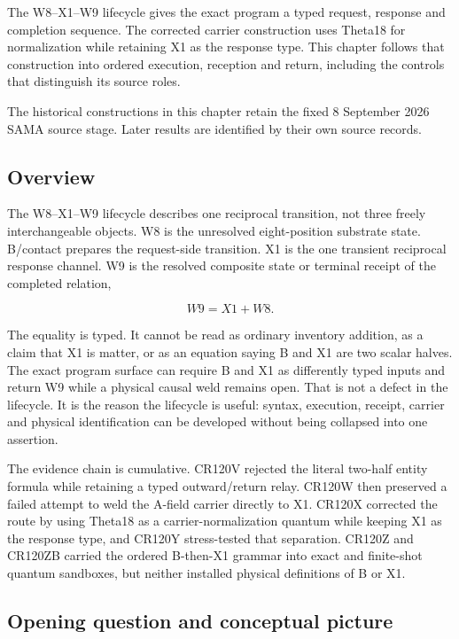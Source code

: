 \label{viii-ch05-lifecycle-reception-and-carrier-return}

The W8--X1--W9 lifecycle gives the exact program a typed request, response and completion sequence. The corrected carrier construction uses Theta18 for normalization while retaining X1 as the response type. This chapter follows that construction into ordered execution, reception and return, including the controls that distinguish its source roles.

The historical constructions in this chapter retain the fixed 8 September 2026 SAMA source stage. Later results are identified by their own source records.

\subsection{Overview}\label{viii-ch05-overview}

The W8--X1--W9 lifecycle describes one reciprocal transition, not three
freely interchangeable objects. W8 is the unresolved eight-position
substrate state. B/contact prepares the request-side transition. X1 is
the one transient reciprocal response channel. W9 is the resolved
composite state or terminal receipt of the completed relation,

\[
W9=X1+W8.
\]

The equality is typed. It cannot be read as ordinary inventory addition,
as a claim that X1 is matter, or as an equation saying B and X1 are two
scalar halves. The exact program surface can require B and X1 as
differently typed inputs and return W9 while a physical causal weld
remains open. That is not a defect in the lifecycle. It is the reason
the lifecycle is useful: syntax, execution, receipt, carrier and
physical identification can be developed without being collapsed into
one assertion.

The evidence chain is cumulative. CR120V rejected the literal two-half
entity formula while retaining a typed outward/return relay. CR120W then
preserved a failed attempt to weld the A-field carrier directly to X1.
CR120X corrected the route by using Theta18 as a carrier-normalization
quantum while keeping X1 as the response type, and CR120Y stress-tested
that separation. CR120Z and CR120ZB carried the ordered B-then-X1
grammar into exact and finite-shot quantum sandboxes, but neither
installed physical definitions of B or X1.

\subsection{Opening question and conceptual
picture}\label{viii-ch05-opening-question-and-conceptual-picture}

